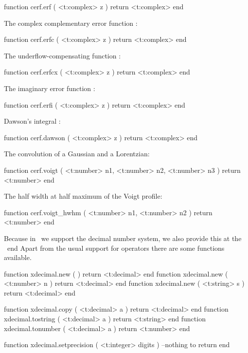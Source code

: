 \starttyping[option=LUA]
function cerf.erf ( <t:complex> z )
    return <t:complex>
end
\stoptyping

The complex complementary error function :

\starttyping[option=LUA]
function cerf.erfc ( <t:complex> z )
    return <t:complex>
end
\stoptyping

The underflow-compensating function :

\starttyping[option=LUA]
function cerf.erfcx ( <t:complex> z )
    return <t:complex>
end
\stoptyping

The imaginary error function :

\starttyping[option=LUA]
function cerf.erfi ( <t:complex> z )
    return <t:complex>
end
\stoptyping

Dawson's integral :

\starttyping[option=LUA]
function cerf.dawson ( <t:complex> z )
    return <t:complex>
end
\stoptyping

The convolution of a Gaussian and a Lorentzian:

\starttyping[option=LUA]
function cerf.voigt (
    <t:number> n1,
    <t:number> n2,
    <t:number> n3
)
    return <t:number>
end
\stoptyping

The half width at half maximum of the Voigt profile:

\starttyping[option=LUA]
function cerf.voigt_hwhm (
    <t:number> n1,
    <t:number> n2
)
    return <t:number>
end
\stoptyping

\stopsubsection

\startsubsection[title=Decimal numbers]

Because in \METAPOST\ we support the decimal number system, we also provide this
at the \TEX\ end Apart from the usual support for operators there are some
functions available.

\starttyping[option=LUA]
function xdecimal.new ( )              return <t:decimal> end
function xdecimal.new ( <t:number> n ) return <t:decimal> end
function xdecimal.new ( <t:string> s ) return <t:decimal> end
\stoptyping

\starttyping[option=LUA]
function xdecimal.copy     ( <t:decimal> a ) return <t:decimal> end
function xdecimal.tostring ( <t:decimal> a ) return <t:string>  end
function xdecimal.tonumber ( <t:decimal> a ) return <t:number>  end
\stoptyping

\starttyping[option=LUA]
function xdecimal.setprecision ( <t:integer> digits )
    --nothing to return
end

